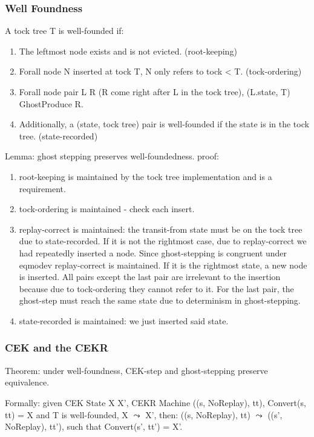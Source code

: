 \subsubsection{Well Foundness}
A tock tree T is well-founded if:
\begin{enumerate}
    \item The leftmost node exists and is not evicted. (root-keeping)
    \item Forall node N inserted at tock T, N only refers to tock < T. (tock-ordering)
    \item Forall node pair L R (R come right after L in the tock tree), (L.state, T) GhostProduce R.
    \item Additionally, a (state, tock tree) pair is well-founded if the state is in the tock tree. (state-recorded)
\end{enumerate}

Lemma: ghost stepping preserves well-foundedness.
proof:
\begin{enumerate}
    \item root-keeping is maintained by the tock tree implementation and is a requirement.
    \item tock-ordering is maintained - check each insert.
    \item replay-correct is maintained: the transit-from state must be on the tock tree due to state-recorded. If it is not the rightmost case, due to replay-correct we had repeatedly inserted a node. Since ghost-stepping is congruent under eqmodev replay-correct is maintained. If it is the rightmost state, a new node is inserted. All pairs except the last pair are irrelevant to the insertion because due to tock-ordering they cannot refer to it. For the last pair, the ghost-step must reach the same state due to determinism in ghost-stepping.
    \item state-recorded is maintained: we just inserted said state.
\end{enumerate}

\subsubsection{CEK and the CEKR}
Theorem: under well-foundness, CEK-step and ghost-stepping preserve equivalence.

Formally: given CEK State X X', CEKR Machine ((s, NoReplay), tt), Convert(s, tt) = X and T is well-founded, X $\leadsto$ X', then: ((s, NoReplay), tt) $\leadsto$ ((s', NoReplay), tt'), such that Convert(s', tt') = X'.

